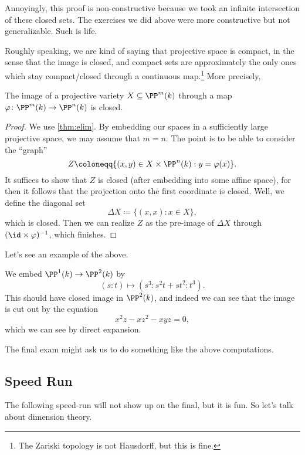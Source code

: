 Annoyingly, this proof is non-constructive because we took an infinite intersection of these closed sets. The exercises we did above were more constructive but not generalizable. Such is life.

Roughly speaking, we are kind of saying that projective space is compact, in the sense that the image is closed, and compact sets are approximately the only ones which stay compact/closed through a continuous map.\footnote{The Zariski topology is not Hausdorff, but this is fine.} More precisely, 
\begin{corollary}
	The image of a projective variety $X\subseteq\PP^m(k)$ through a map $\varphi\colon\PP^m(k)\to\PP^n(k)$ is closed.
\end{corollary}
\begin{proof}
	We use \autoref{thm:elim}. By embedding our spaces in a sufficiently large projective space, we may assume that $m=n$. The point is to be able to consider the ``graph''
	\[Z\coloneqq\{(x,y)\in X\times\PP^n(k):y=\varphi(x)\}.\]
	It suffices to show that $Z$ is closed (after embedding into some affine space), for then it follows that the projection onto the first coordinate is closed. Well, we define the diagonal set
	\[\Delta X\coloneqq\{(x,x):x\in X\},\]
	which is closed. Then we can realize $Z$ as the pre-image of $\Delta X$ through $(\id\times\varphi)^{-1}$, which finishes.
\end{proof}
Let's see an example of the above.
\begin{ex}
	We embed $\PP^1(k)\to\PP^2(k)$ by
	\[(s:t)\mapsto\left(s^3:s^2t+st^2:t^3\right).\]
	This should have closed image in $\PP^2(k)$, and indeed we can see that the image is cut out by the equation
	\[x^2z-xz^2-xyz=0,\]
	which we can see by direct expansion.
\end{ex}
\begin{remark}
	The final exam might ask us to do something like the above computations.
\end{remark}

\subsection{Speed Run}
The following speed-run will not show up on the final, but it is fun. So let's talk about dimension theory.

